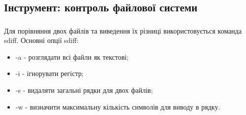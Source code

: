 \documentclass[t]{beamer}  %
\begin{document}
\subsection{Інструмент: контроль файлової системи}

\begin{frame}
 	\frametitle{\insertsection} 
 	\framesubtitle{\insertsubsection}
Для порівняння двох файлів та виведення їх різниці використовується команда sdiff. Основні опції sdiff:
\begin{itemize}
   	  \item -a - розглядати всі файли як текстові;
   	  \item -i - ігнорувати регістр;
   	  \item -s - видаляти загальні рядки для двох файлів;
   	  \item -w - визначити максимальну кількість символів для виводу в рядку.
\end{itemize}   	

 \end{frame}
\end{document}

